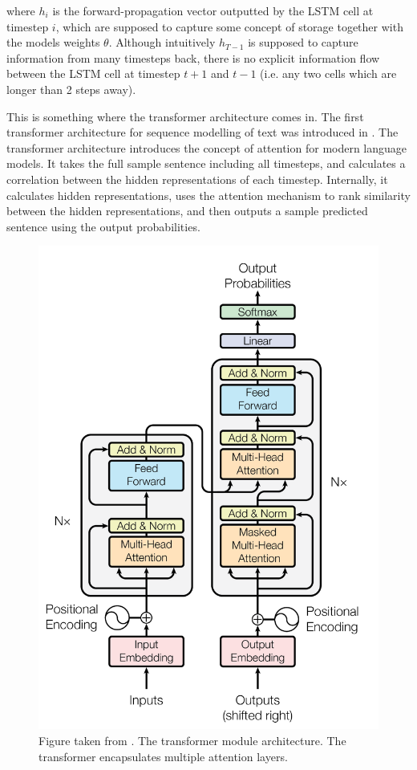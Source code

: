 \documentclass[a4paper,12pt,twoside,openright]{report}
\begin{document}
where $h_{i}$ is the forward-propagation vector outputted by the LSTM cell at timestep $i$, which are supposed to capture some concept of storage together with the models weights $\theta$.
Although intuitively $h_{T-1}$ is supposed to capture information from many timesteps back, there is no explicit information flow between the LSTM cell at timestep $t+1$ and $t-1$ (i.e. any two cells which are longer than 2 steps away).

This is something where the transformer architecture comes in.
The first transformer architecture for sequence modelling of text was introduced in \cite{vaswani17}.
The transformer architecture introduces the concept of attention for modern language models.
It takes the full sample sentence including all timesteps, and calculates a correlation between the hidden representations of each timestep.
Internally, it calculates hidden representations, uses the attention mechanism to rank similarity between the hidden representations, and then outputs a sample predicted sentence using the output probabilities.


\begin{figure}[H]
	\center
  \includegraphics[width=0.5\linewidth]{./assets/background/transformer_module.png}
  \caption{Figure taken from \cite{vaswani17}. The transformer module architecture. The transformer encapsulates multiple attention layers.}
  \label{fig:attention_is_all_you_need}
\end{figure}
\end{document}
